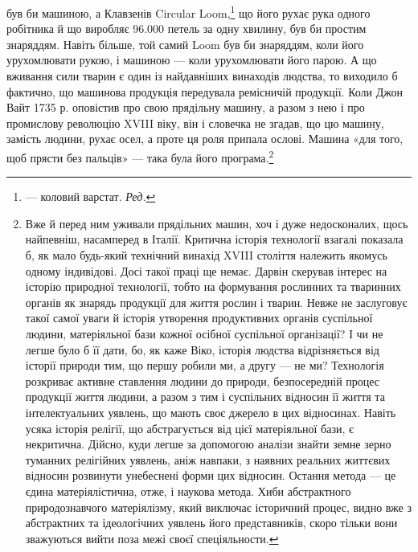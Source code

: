 \parcont{}  %
був би машиною, а Клавзенів Circular Loom,\footnote*{
— коловий варстат. \emph{Ред.}
} що його рухає
рука одного робітника й що виробляє 96.000 петель за одну хвилину,
був би простим знаряддям. Навіть більше, той самий Loom
був би знаряддям, коли його урухомлювати рукою, і машиною —
коли урухомлювати його парою. А що вживання сили тварин є
один із найдавніших винаходів людства, то виходило б фактично,
що машинова продукція передувала ремісничій продукції. Коли
Джон Вайт 1735 р. оповістив про свою прядільну машину, а
разом з нею і про промислову революцію XVIII віку, він і словечка
не згадав, що цю машину, замість людини, рухає осел, а
проте ця роля припала ослові. Машина «для того, щоб прясти
без пальців» — така була його програма.\footnote{
Вже й перед ним уживали прядільних машин, хоч і дуже недосконалих,
щось найпевніш, насамперед в Італії. Критична історія технології
взагалі показала б, як мало будь-який технічний винахід XVIII століття
належить якомусь одному індивідові. Досі такої праці ще немає. Дарвін
скерував інтерес на історію природної технології, тобто на формування
рослинних та тваринних органів як знарядь продукції для життя рослин і
тварин. Невже не заслуговує такої самої уваги й історія утворення
продуктивних органів суспільної людини, матеріяльної бази кожної
осібної суспільної організації? І чи не легше було б її дати, бо, як каже
Віко, історія людства відрізняється від історії природи тим, що першу
робили ми, а другу — не ми? Технологія розкриває активне ставлення
людини до природи, безпосередній процес продукції життя людини, а
разом з тим і суспільних відносин її життя та інтелектуальних уявлень,
що мають своє джерело в цих відносинах. Навіть усяка історія релігії,
що абстрагується від цієї матеріяльної бази, є некритична. Дійсно,
куди легше за допомогою аналізи знайти земне зерно туманних релігійних
уявлень, аніж навпаки, з наявних реальних життєвих відносин розвинути
унебеснені форми цих відносин. Остання метода — це єдина матеріялістична,
отже, і наукова метода. Хиби абстрактного природознавчого
матеріялізму, який виключає історичний процес, видно вже з абстрактних
та ідеологічних уявлень його представників, скоро тільки вони зважуються
вийти поза межі своєї спеціяльности.
}

